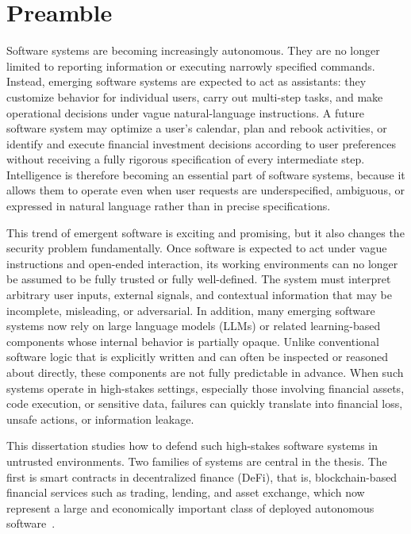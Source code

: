 \section{Preamble}

Software systems are becoming increasingly autonomous. 
They are no longer limited to reporting information or 
executing narrowly specified commands. Instead, 
emerging software systems are expected to act as 
assistants: they customize behavior for individual users, 
carry out multi-step tasks, and make operational decisions 
under vague natural-language instructions. 
A future software system may optimize a user's calendar,
plan and rebook activities, or identify and execute 
financial investment decisions according to user 
preferences without receiving a fully rigorous 
specification of every intermediate step. 
Intelligence is therefore becoming an essential part of software systems, 
because it allows them to operate even when user 
requests are underspecified, ambiguous, or expressed 
in natural language rather than in precise specifications.

This trend of emergent software is exciting and promising, 
but it also changes the security 
problem fundamentally. Once software is expected to act under 
vague instructions and open-ended interaction, its working environments can no 
longer be assumed to be fully trusted or fully well-defined. 
The system must interpret arbitrary user inputs, external signals, 
and contextual information that may be incomplete, misleading, or 
adversarial. In addition, many emerging software systems now rely on 
large language models (LLMs) or related learning-based components 
whose internal behavior is partially opaque. 
Unlike conventional software logic that is explicitly written 
and can often be inspected or reasoned about directly, 
these components are not fully predictable in advance. 
When such systems operate in high-stakes settings, 
especially those involving financial assets, 
code execution, or sensitive data, failures can quickly 
translate into financial loss, unsafe actions, or information leakage.

This dissertation studies how to defend such high-stakes software systems 
in untrusted environments. Two families of systems are central in the thesis. 
The first is smart contracts in decentralized finance (DeFi), 
that is, blockchain-based financial services such as trading, 
lending, and asset exchange, which now represent a large and economically 
important class of deployed autonomous software~\cite{DeFillama}. 

